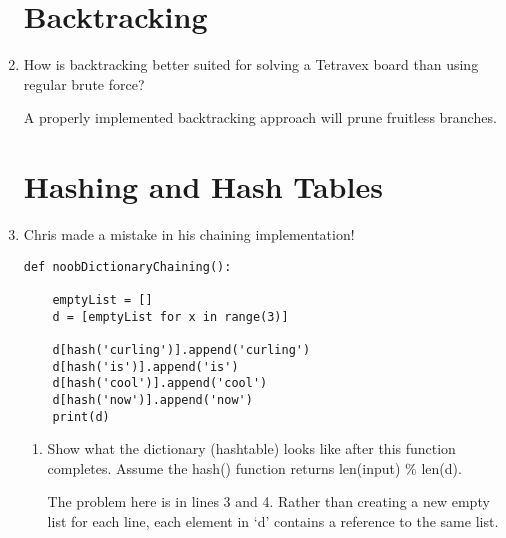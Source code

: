 \documentclass[11pt]{article}
\newenvironment{answer}{\large\lstset{basicstyle=\large}\color{white}}{}
\newenvironment{answer}{\large\lstset{basicstyle=\large}\color{red}}{}
\begin{document}
\begin{enumerate}
\begin{answer}
    \end{answer}

\section*{Backtracking}

\item How is backtracking better suited for solving a Tetravex board than
      using regular brute force?

    \begin{answer}
    A properly implemented backtracking approach will prune fruitless branches. 
    \end{answer}

\pagebreak
\section*{Hashing and Hash Tables}

\item Chris made a mistake in his chaining implementation!

\begin{lstlisting}
def noobDictionaryChaining():

    emptyList = []
    d = [emptyList for x in range(3)]

    d[hash('curling')].append('curling')
    d[hash('is')].append('is')
    d[hash('cool')].append('cool')
    d[hash('now')].append('now')
    print(d)
\end{lstlisting}

    \begin{enumerate}
    \item Show what the dictionary (hashtable) looks like after this function
          completes. Assume the hash() function returns len(input) \% len(d).

        \begin{answer}
            The problem here is in lines 3 and 4. Rather than creating a new
            empty list for each line, each element in `d' contains a reference
            to the same list.


\end{answer}
\end{enumerate}
\end{enumerate}
\end{document}
